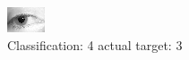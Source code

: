 \begin{figure}[h!]
\begin{center}
\includegraphics[width=0.60\columnwidth]{figures/ID1324_class_4_target_3.png}
\end{center}
\caption{ Classification: 4 actual target: 3}
\label{fig:ID1324_class_4_target_3}
\end{figure}
